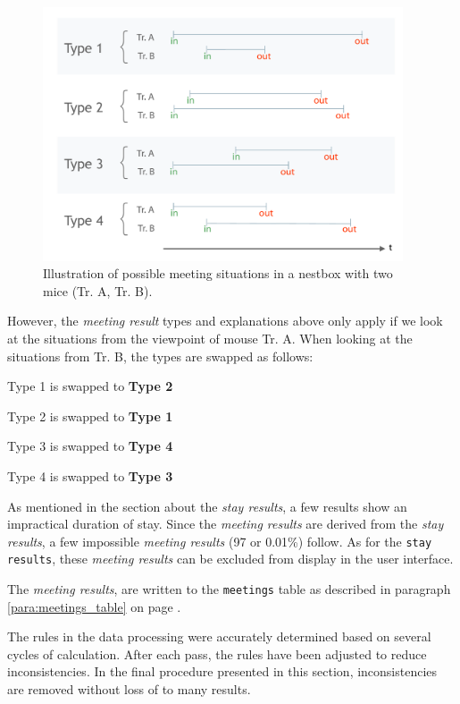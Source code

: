 \begin{figure}[htpb]
\begin{center}
  \includegraphics[width=0.95\textwidth]{assets/pdf/meeting_types_schema.pdf}
  \caption[illustration of meeting result types]{Illustration of possible meeting situations in a nestbox with two mice (Tr. A, Tr. B).}
  \label{fig:meeting_types}
\end{center}
\end{figure}

However, the \textit{meeting result} types and explanations above only apply if we look at the situations from the viewpoint of mouse Tr. A. When looking at the situations from Tr. B, the types are swapped as follows:

\begin{mylist}
\item Type 1 is swapped to \textbf{Type 2}   
\item Type 2 is swapped to \textbf{Type 1}
\item Type 3 is swapped to \textbf{Type 4} 
\item Type 4 is swapped to \textbf{Type 3}
\end{mylist}

As mentioned in the section about the \textit{stay results}, a few results show an impractical duration of stay. Since the \textit{meeting results} are derived from the \textit{stay results}, a few impossible \textit{meeting results} (97 or 0.01\%) follow. As for the \lstinline|stay results|, these \textit{meeting results} can be excluded from display in the user interface.

The \textit{meeting results}, are written to the \lstinline|meetings| table as described in paragraph \ref{para:meetings_table} on page \pageref{para:meetings_table}. 

The rules in the data processing were accurately determined based on several cycles of calculation. After each pass, the rules have been adjusted to reduce inconsistencies. In the final procedure presented in this section, inconsistencies are removed without loss of to many results.
